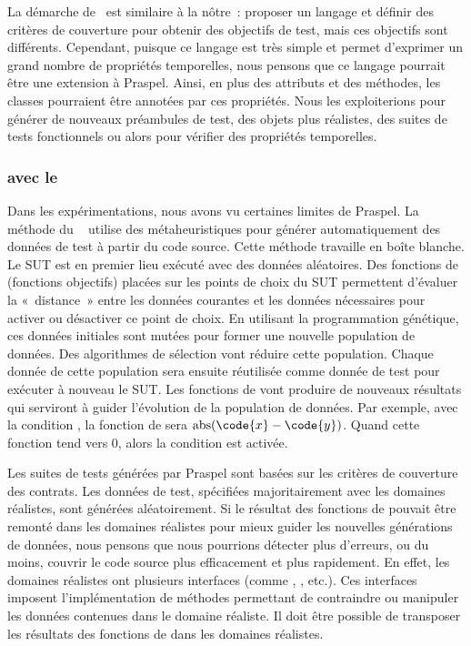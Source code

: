 La démarche de~ est similaire à la nôtre~: proposer un
langage et définir des critères de couverture pour obtenir des objectifs de
test, mais ces objectifs sont différents. Cependant, puisque ce langage est très
simple et permet d'exprimer un grand nombre de propriétés temporelles, nous
pensons que ce langage pourrait être une extension à Praspel. Ainsi, en plus des
attributs et des méthodes, les classes pourraient être annotées par ces
propriétés. Nous les exploiterions pour générer de nouveaux préambules de test,
des objets plus réalistes, des suites de tests fonctionnels ou alors pour
vérifier des propriétés temporelles.

\subsubsection{ avec le }

Dans les expérimentations, nous avons vu certaines limites de Praspel. La
méthode du ~ utilise des
métaheuristiques pour générer automatiquement des données de test à partir du
code source. Cette méthode travaille en boîte blanche. Le SUT est en premier
lieu exécuté avec des données aléatoires. Des fonctions de 
(fonctions objectifs) placées sur les points de choix du SUT permettent
d'évaluer la «~distance~» entre les données courantes et les données nécessaires
pour activer ou désactiver ce point de choix. En utilisant la programmation
génétique, ces données initiales sont mutées pour former une nouvelle population
de données. Des algorithmes de sélection vont réduire cette population. Chaque
donnée de cette population sera ensuite réutilisée comme donnée de test pour
exécuter à nouveau le SUT. Les fonctions de  vont produire de
nouveaux résultats qui serviront à guider l'évolution de la population de
données. Par exemple, avec la condition , la fonction de
 sera $\mathrm{abs}(\code{x} - \code{y})$. Quand cette
fonction tend vers 0, alors la condition est activée.

Les suites de tests générées par Praspel sont basées sur les critères de
couverture des contrats. Les données de test, spécifiées majoritairement avec
les domaines réalistes, sont générées aléatoirement. Si le résultat des
fonctions de  pouvait être remonté dans les domaines
réalistes pour mieux guider les nouvelles générations de données, nous pensons
que nous pourrions détecter plus d'erreurs, ou du moins, couvrir le code source
plus efficacement et plus rapidement. En effet, les domaines réalistes ont
plusieurs interfaces (comme , , 
etc.). Ces interfaces imposent l'implémentation de méthodes permettant de
contraindre ou manipuler les données contenues dans le domaine réaliste. Il doit
être possible de transposer les résultats des fonctions de 
dans les domaines réalistes.

